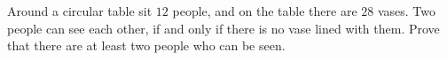 Around a circular table sit $12$ people, and on the table there are $28$ vases. Two people can see each other, if and only if there is no vase lined with them. Prove that there are at least two people who can be seen.